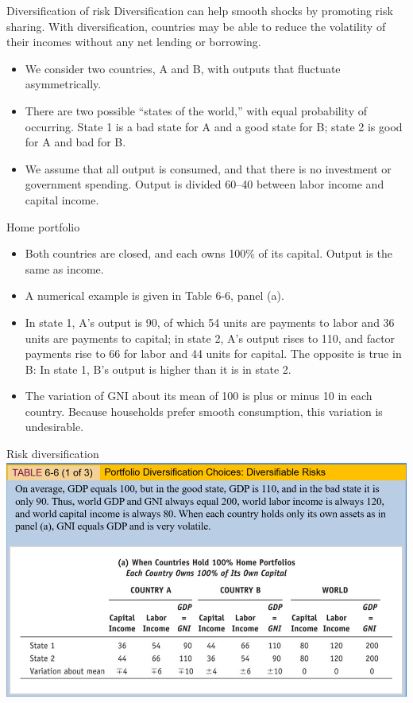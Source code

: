 \documentclass[
  ignorenonframetext,
]{beamer}
\begin{document}
\begin{frame}{Diversification of risk}
\label{diversification-of-risk}
Diversification can help smooth shocks by promoting risk sharing. With
diversification, countries may be able to reduce the volatility of their
incomes without any net lending or borrowing.

\begin{itemize}
\item
  We consider two countries, A and B, with outputs that fluctuate
  asymmetrically.
\item
  There are two possible ``states of the world,'' with equal probability
  of occurring. State 1 is a bad state for A and a good state for B;
  state 2 is good for A and bad for B.
\item
  We assume that all output is consumed, and that there is no investment
  or government spending. Output is divided 60--40 between labor income
  and capital income.
\end{itemize}
\end{frame}

\begin{frame}{Home portfolio}
\label{home-portfolio}
\begin{itemize}
\item
  Both countries are closed, and each owns 100\% of its capital. Output
  is the same as income.
\item
  A numerical example is given in Table 6-6, panel (a).
\item
  In state 1, A's output is 90, of which 54 units are payments to labor
  and 36 units are payments to capital; in state 2, A's output rises to
  110, and factor payments rise to 66 for labor and 44 units for
  capital. The opposite is true in B: In state 1, B's output is higher
  than it is in state 2.
\item
  The variation of GNI about its mean of 100 is plus or minus 10 in each
  country. Because households prefer smooth consumption, this variation
  is undesirable.
\end{itemize}
\end{frame}

\begin{frame}{Risk diversification}
\label{risk-diversification}
\includegraphics{pic5a.png}
\end{frame}
\end{document}
